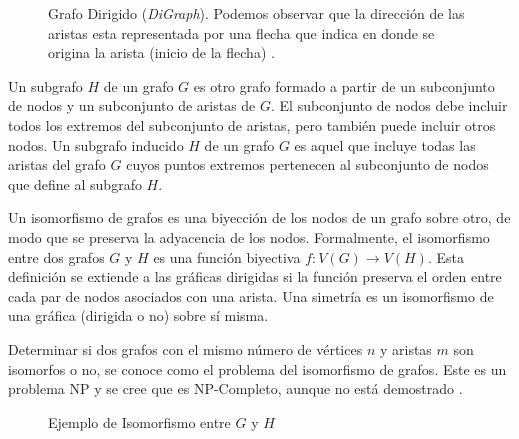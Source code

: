  \begin{figure}[htbp]
   \centering
   
    \caption{Grafo Dirigido (\textit{DiGraph}). Podemos observar que la dirección de las aristas esta representada por una flecha que indica en donde se origina la arista (inicio de la flecha) 
    .}
    \label{fig:digraph}
\end{figure}

Un subgrafo $H$ de un grafo $G$ es otro grafo formado a partir de un subconjunto de nodos y un subconjunto de aristas de $G$. El subconjunto de nodos debe incluir todos los extremos del subconjunto de aristas, pero también puede incluir otros nodos. Un subgrafo inducido $H$ de un grafo $G$ es aquel que incluye todas las aristas del grafo $G$ cuyos puntos extremos pertenecen al subconjunto de nodos que define al subgrafo $H$.

Un isomorfismo de grafos es una biyección de los nodos de un grafo sobre otro, de modo que se preserva la adyacencia de los nodos. Formalmente, el isomorfismo entre dos grafos $G$ y $H$ es una función biyectiva  $f:V(G) \rightarrow V(H)$. Esta definición se extiende a las gráficas dirigidas si la función preserva el orden entre cada par de nodos asociados con una arista. 
Una simetría es un isomorfismo de una gráfica (dirigida o no) sobre sí misma.

Determinar si dos grafos con el mismo número de vértices $n$ y aristas $m$ son isomorfos o no, se conoce como el problema del isomorfismo de grafos. Este es un problema NP y se cree que es NP-Completo, aunque no está demostrado \cite{kobler_graph_1993}.

\label{subsection:isomorphism}

 \begin{figure}[htbp]
   \centering
   
    \caption{Ejemplo de Isomorfismo entre $G$ y $H$}
    \label{fig:isomorphism}
\end{figure}

 


